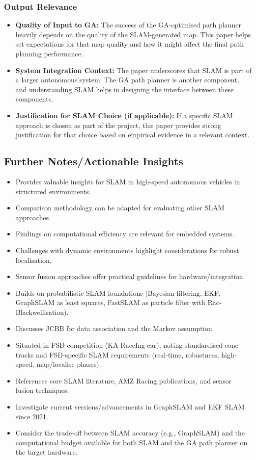 \subsubsection{Output Relevance}
\begin{itemize}
    \item \textbf{Quality of Input to GA:} The success of the GA-optimised path planner heavily depends on the quality of the SLAM-generated map. This paper helps set expectations for that map quality and how it might affect the final path planning performance.
    \item \textbf{System Integration Context:} The paper underscores that SLAM is part of a larger autonomous system. The GA path planner is another component, and understanding SLAM helps in designing the interface between these components.
    \item \textbf{Justification for SLAM Choice (if applicable):} If a specific SLAM approach is chosen as part of the project, this paper provides strong justification for that choice based on empirical evidence in a relevant context.
\end{itemize}

\subsection{Further Notes/Actionable Insights}\label{subsec:further-notes/actionable-insights3}
\begin{itemize}
    \item Provides valuable insights for SLAM in high-speed autonomous vehicles in structured environments.
    \item Comparison methodology can be adapted for evaluating other SLAM approaches.
    \item Findings on computational efficiency are relevant for embedded systems.
    \item Challenges with dynamic environments highlight considerations for robust localisation.
    \item Sensor fusion approaches offer practical guidelines for hardware/integration.
    \item Builds on probabilistic SLAM foundations (Bayesian filtering, EKF, GraphSLAM as least squares, FastSLAM as particle filter with Rao-Blackwellisation).
    \item Discusses JCBB for data association and the Markov assumption.
    \item Situated in FSD competition (KA-RaceIng car), noting standardised cone tracks and FSD-specific SLAM requirements (real-time, robustness, high-speed, map/localise phases).
    \item References core SLAM literature, AMZ Racing publications, and sensor fusion techniques.
    \item Investigate current versions/advancements in GraphSLAM and EKF SLAM since 2021.
    \item Consider the trade-off between SLAM accuracy (e.g., GraphSLAM) and the computational budget available for both SLAM and the GA path planner on the target hardware.
\end{itemize}